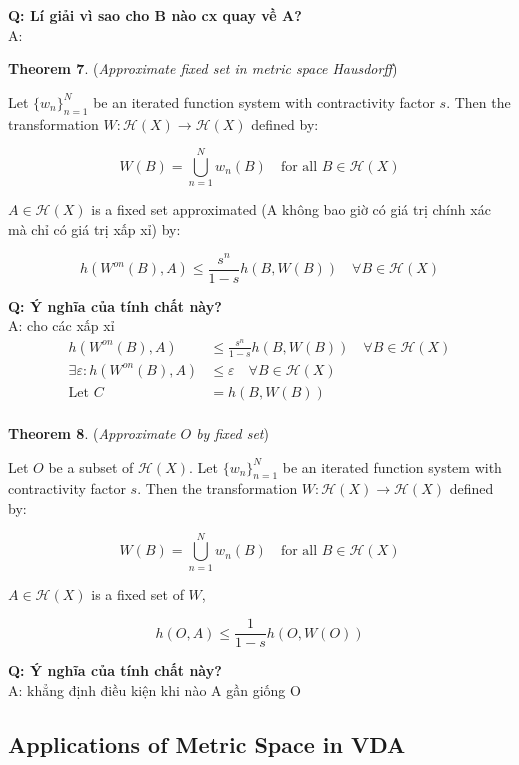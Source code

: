 \textbf{Q: Lí giải vì sao cho B nào cx quay về A?}\\
A:

\textbf{Theorem 7}. (\textit{Approximate fixed set in metric space Hausdorff})

Let \(\{w_n\}_{n=1}^N\) be an iterated function system with contractivity factor \(s\). Then the transformation \(W: \mathcal{H}(X) \rightarrow \mathcal{H}(X)\) defined by:

\[
W(B) = \bigcup_{n=1}^N w_n(B) \quad \text{for all } B \in \mathcal{H}(X)
\]

\(A \in \mathcal{H}(X)\) is a fixed set approximated (A không bao giờ có giá trị chính xác mà chỉ có giá trị xấp xỉ) by:

\[
h(W^{on}(B), A) \leq \frac{s^n}{1 - s} h(B, W(B)) \quad \forall B \in \mathcal{H}(X)
\]

\textbf{Q: Ý nghĩa của tính chất này?}\\
A: cho các xấp xỉ 
\begin{align*}
h(W^{on}(B), A) &\leq \frac{s^n}{1 - s} h(B, W(B)) \quad \forall B \in \mathcal{H}(X)\\
\exists \varepsilon: h(W^{on}(B), A) &\leq \varepsilon \quad \forall B \in \mathcal{H}(X)\\
\textrm{Let } C &= h(B, W(B))\\
\end{align*}

\textbf{Theorem 8}. (\textit{Approximate \(O\) by fixed set})

Let \(O\) be a subset of \(\mathcal{H}(X)\). Let \(\{w_n\}_{n=1}^N\) be an iterated function system with contractivity factor \(s\). Then the transformation \(W: \mathcal{H}(X) \rightarrow \mathcal{H}(X)\) defined by:

\[
W(B) = \bigcup_{n=1}^N w_n(B) \quad \text{for all } B \in \mathcal{H}(X)
\]

\(A \in \mathcal{H}(X)\) is a fixed set of \(W\),

\[
h(O, A) \leq \frac{1}{1 - s} h(O, W(O))
\]

\textbf{Q: Ý nghĩa của tính chất này?}\\
A: khẳng định điều kiện khi nào A gần giống O

\pagebreak
\subsection{Applications of Metric Space in VDA}














